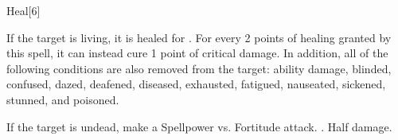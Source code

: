 \begin{spellsection}{Heal}[6]
    \begin{spellheader}
    \end{spellheader}
    \begin{spellcontent}
        \begin{spelltargetinginfo}
        \end{spelltargetinginfo}
        \begin{spelleffects}
            \spelleffect If the target is living, it is healed for . For every 2 points of healing granted by this spell, it can instead cure 1 point of critical damage. In addition, all of the following conditions are also removed from the target: ability damage, blinded, confused, dazed, deafened, diseased, exhausted, fatigued, nauseated, sickened, stunned, and poisoned.
            \begin{spellattacktriggered}{If the target is undead, make a Spellpower vs. Fortitude attack.}
                \spellsuccess {}.
                \spellfailure Half damage.
            \end{spellattacktriggered}
        \end{spelleffects}
    \end{spellcontent}
    \begin{spellfooter}
        \miscastrandom
    \end{spellfooter}
\end{spellsection}

